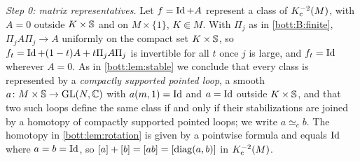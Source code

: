 \emph{Step 0: matrix representatives.} Let $f=\operatorname{Id}+A$ represent a class of $K_{\mathrm{c}}^{-2}(M)$,
with $A=0$ outside $K\times\mathbb{S}$ and on $M\times\{1\}$, $K\Subset M$. With $\Pi_j$ as in
\ref{bott:B:finite}, $\Pi_jA\Pi_j\to A$ uniformly on the compact set $K\times\mathbb{S}$, so
$f_t=\operatorname{Id}+(1-t)A+t\Pi_jA\Pi_j$ is invertible for all $t$ once $j$ is large, and $f_t=\operatorname{Id}$
wherever $A=0$. As in \cref{bott:lem:stable} we conclude that every class is represented by
a \emph{compactly supported pointed loop}, a smooth $a\colon M\times\mathbb{S}\to\operatorname{GL}(N,\mathbb{C})$ with
$a(m,1)=\operatorname{Id}$ and $a=\operatorname{Id}$ outside $K\times\mathbb{S}$, and that two such loops define the same
class if and only if their stabilizations are joined by a homotopy of compactly supported
pointed loops; we write $a\simeq_cb$. The homotopy in \cref{bott:lem:rotation} is given by
a pointwise formula and equals $\operatorname{Id}$ where $a=b=\operatorname{Id}$, so $[a]+[b]=[ab]=[\operatorname{diag}(a,b)]$ in
$K_{\mathrm{c}}^{-2}(M)$.

